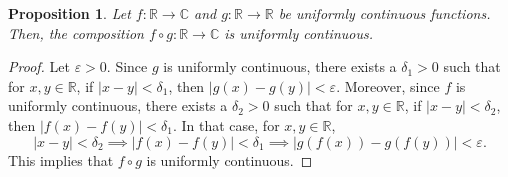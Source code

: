 \documentclass[a4paper, openany]{memoir}
\theoremstyle{definition}
\theoremstyle{plain}
\newtheorem{proposition}[definition]{Proposition}
\begin{document}
\begin{proposition}
Let $f: \mathbb{R} \to \mathbb{C}$ and $g: \mathbb{R} \to \mathbb{R}$ be uniformly continuous functions. Then, the composition $f \circ g: \mathbb{R} \to \mathbb{C}$ is uniformly continuous.
\end{proposition}
\begin{proof}
Let $\varepsilon > 0$. Since $g$ is uniformly continuous, there exists a $\delta_1 > 0$ such that for $x, y \in \mathbb{R}$, if $|x - y| < \delta_1$, then $|g(x) - g(y)| < \varepsilon$. Moreover, since $f$ is uniformly continuous, there exists a $\delta_2 > 0$ such that for $x, y \in \mathbb{R}$, if $|x - y| < \delta_2$, then $|f(x) - f(y)| < \delta_1$. In that case, for $x, y \in \mathbb{R}$,
\[|x - y| < \delta_2 \implies |f(x) - f(y)| < \delta_1 \implies |g(f(x)) - g(f(y))| < \varepsilon.\]
This implies that $f \circ g$ is uniformly continuous.
\end{proof}
\newpage
\end{document}
